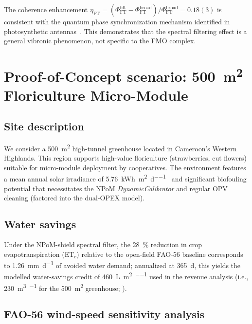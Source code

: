 \documentclass[11pt,a4paper]{article}
\begin{document}
The coherence enhancement $\eta_{\mathrm{FT}} = (\Phi_{\mathrm{FT}}^{\mathrm{filt}} - \Phi_{\mathrm{FT}}^{\mathrm{broad}}) / \Phi_{\mathrm{FT}}^{\mathrm{broad}} = 0.18(3)$ is consistent with the quantum phase synchronization mechanism identified in photosynthetic antennas~\cite{Zhu2024}.
This demonstrates that the spectral filtering effect is a general vibronic phenomenon, not specific to the FMO complex.


\section{Proof-of-Concept scenario: \texorpdfstring{\qty{500}{\m\squared}}{500 m\texttwosuperior} Floriculture Micro-Module}
\label{SI-sec:poc}

\subsection{Site description}

We consider a \qty{500}{\m\squared} high-tunnel greenhouse located in Cameroon's Western Highlands.
This region supports high-value floriculture (strawberries, cut flowers) suitable for micro-module deployment by cooperatives. The environment features a mean annual solar irradiance of \qty{5.76}{\kWh\per\m\squared\per\day}~\cite{FAO2022} and significant biofouling potential that necessitates the NPoM \textit{DynamicCalibrator} and regular OPV cleaning (factored into the dual-OPEX model).

\subsection{Water savings}

Under the NPoM-shield spectral filter, the \qty{28}{\percent} reduction in crop evapotranspiration (ET$_c$) relative to the open-field FAO-56 baseline corresponds to \qty{1.26}{\mm\per\day} of avoided water demand; annualized at \qty{365}{\day}, this yields the modelled water-savings credit of \qty{460}{\L\per\m\squared\per\yr} used in the revenue analysis (i.e., \qty{230}{\m\cubed\per\yr} for the \qty{500}{\m\squared} greenhouse; ).

\subsection{FAO-56 wind-speed sensitivity analysis}
\label{SI-sec:fao56_sensitivity}
\end{document}
